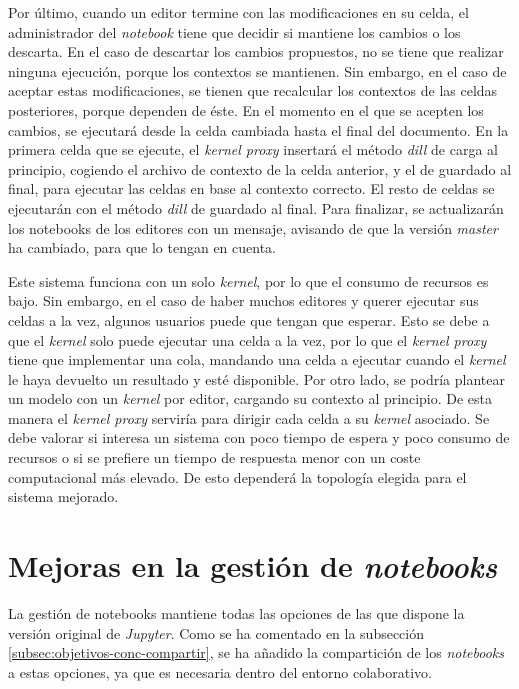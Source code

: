 \documentclass[11pt,spanish,listoffigures]{tfgetsinf}
\begin{document}
Por último, cuando un editor termine con las modificaciones en su celda, el administrador del \textit{notebook} tiene que decidir si mantiene los cambios o los descarta. En el caso de descartar los cambios propuestos, no se tiene que realizar ninguna ejecución, porque los contextos se mantienen. Sin embargo, en el caso de aceptar estas modificaciones, se tienen que recalcular los contextos de las celdas posteriores, porque dependen de éste. En el momento en el que se acepten los cambios, se ejecutará desde la celda cambiada hasta el final del documento.  En la primera celda que se ejecute, el \textit{kernel proxy} insertará el método \textit{dill} de carga al principio, cogiendo el archivo de contexto de la celda anterior, y el de guardado al final, para ejecutar las celdas en base al contexto correcto. El resto de celdas se ejecutarán con el método \textit{dill} de guardado al final. Para finalizar, se actualizarán los notebooks de los editores con un mensaje, avisando de que la versión \textit{master} ha cambiado, para que lo tengan en cuenta.

Este sistema funciona con un solo \textit{kernel}, por lo que el consumo de recursos es bajo. Sin embargo, en el caso de haber muchos editores y querer ejecutar sus celdas a la vez, algunos usuarios puede que tengan que esperar. Esto se debe a que el \textit{kernel} solo puede ejecutar una celda a la vez, por lo que el \textit{kernel proxy} tiene que implementar una cola, mandando una celda a ejecutar cuando el \textit{kernel} le haya devuelto un resultado y esté disponible. Por otro lado, se podría plantear un modelo con un \textit{kernel} por editor, cargando su contexto al principio. De esta manera el \textit{kernel proxy} serviría para dirigir cada celda a su \textit{kernel} asociado. Se debe valorar si interesa un sistema con poco tiempo de espera y poco consumo de recursos o si se prefiere un tiempo de respuesta menor con un coste computacional más elevado. De esto dependerá la topología elegida para el sistema mejorado.


\section{Mejoras en la gestión de \textit{notebooks}}
\label{sec:mejoras-gestión}

La gestión de notebooks mantiene todas las opciones de las que dispone la versión original de \textit{Jupyter}. Como se ha comentado en la subsección \ref{subsec:objetivos-conc-compartir}, se ha añadido la compartición de los \textit{notebooks} a estas opciones, ya que es necesaria dentro del entorno colaborativo. 
\end{document}
